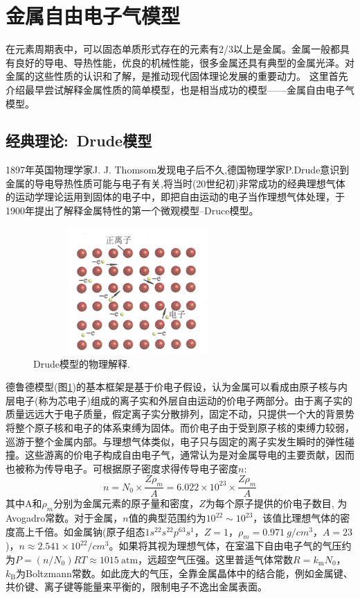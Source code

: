 \section{金属自由电子气模型}\label{Section:Free-electron}
在元素周期表中，可以固态单质形式存在的元素有2/3以上是金属。金属一般都具有良好的导电、导热性能，优良的机械性能，很多金属还具有典型的金属光泽。对金属的这些性质的认识和了解，是推动现代固体理论发展的重要动力。
这里首先介绍最早尝试解释金属性质的简单模型，也是相当成功的模型——金属自由电子气模型。 

\subsection{经典理论:~Drude模型}
1897年英国物理学家J. J. Thomsom发现电子后不久,德国物理学家P.Drude意识到金属的导电导热性质可能与电子有关,将当时(20世纪初)非常成功的经典理想气体的运动学理论运用到固体的电子中，即把自由运动的电子当作理想气体处理，于1900年提出了解释金属特性的第一个微观模型--Druce模型。
\begin{figure}[h!]
\centering
\vspace*{-0.05in}
\includegraphics[height=1.90in,width=3.15in,viewport=0 0 130 80,clip]{Figures/Drude_Model.png}
\caption{\small \textrm{Drude模型的物理解释.}}%
\label{Fig:Drude_model}
\end{figure} 
德鲁德模型(图\ref{Fig:Drude_model})的基本框架是基于价电子假设，认为金属可以看成由原子核与内层电子(称为芯电子)组成的离子实和外层自由运动的价电子两部分。由于离子实的质量远远大于电子质量，假定离子实分散排列，固定不动，只提供一个大的背景势将整个原子核和电子的体系束缚为固体。而价电子由于受到原子核的束缚力较弱，巡游于整个金属内部。与理想气体类似，电子只与固定的离子实发生瞬时的弹性碰撞。这些游离的价电子构成自由电子气，通常认为是对金属导电的主要贡献，因而也被称为传导电子。可根据原子密度求得传导电子密度$n$:
\begin{equation}
	n=N_0\times\dfrac{Z\rho_m}A=6.022\times10^{23}\times\dfrac{Z\rho_m}A
	\label{eq:valence_density}
\end{equation}
其中A和$\rho_m$分别为金属元素的原子量和密度，$Z$为每个原子提供的价电子数目, 为Avogadro常数。对于金属，$n$值的典型范围约为$10^{22}\sim10^{23}$，该值比理想气体的密度高上千倍。如金属钠(原子组态$1s^22s^22p^63s^1$，$Z=1$，$\rho_m=0.971~g/cm^3$，$A=23$)，$n\approx2.541\times10^{22}/cm^3$。如果将其视为理想气体，在室温下自由电子气的气压约为$P=(n/N_0)RT\approx1015~\mathrm{atm}$，远超空气压强。这里普适气体常数$R=k_{\mathrm{m}}N_0$，$k_{\mathrm{B}}$为Boltzmann常数。如此庞大的气压，全靠金属晶体中的结合能，例如金属键、共价键、离子键等能量来平衡的，限制电子不逸出金属表面。

